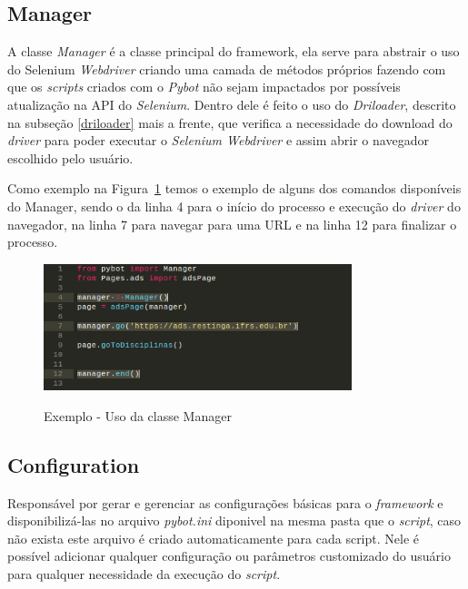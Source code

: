         \subsection{Manager} \label{sec:manager}
        A classe \textit{Manager} é a classe principal do framework, ela serve para abstrair o uso do Selenium \textit{Webdriver} criando uma camada
        de métodos próprios fazendo com que os \textit{scripts} criados com o \textit{Pybot} não sejam impactados por possíveis atualização na API do \textit{Selenium}.
        Dentro dele é feito o uso do \textit{Driloader}, descrito na subseção \ref{driloader} mais a frente, que verifica a necessidade do download do \textit{driver}
        para poder executar o \textit{Selenium Webdriver} e assim abrir o navegador escolhido pelo usuário.

        Como exemplo na Figura~\ref{fig:manager} temos o exemplo de alguns dos comandos disponíveis do Manager, sendo o da linha 4 para o início do processo
        e execução do \textit{driver} do navegador, na linha 7 para navegar para uma URL e na linha 12 para finalizar o processo.

        \begin{figure}[H]
            \vspace*{0,3cm}
            \centering
            \caption{Exemplo - Uso da classe Manager}
            \includegraphics[width=0.8\textwidth]{./04-figuras/manager}
            \label{fig:manager}
        \end{figure}


        \subsection{Configuration}
        Responsável por gerar e gerenciar as configurações básicas para o \textit{framework} e disponibilizá-las no arquivo \textit{pybot.ini} diponivel na mesma pasta que
        o \textit{script}, caso não exista este arquivo é criado automaticamente para cada script. Nele é possível adicionar qualquer configuração ou parâmetros customizado
        do usuário para qualquer necessidade da execução do \textit{script}.

